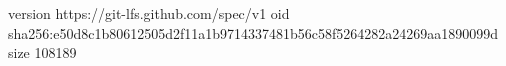 version https://git-lfs.github.com/spec/v1
oid sha256:e50d8c1b80612505d2f11a1b9714337481b56c58f5264282a24269aa1890099d
size 108189
